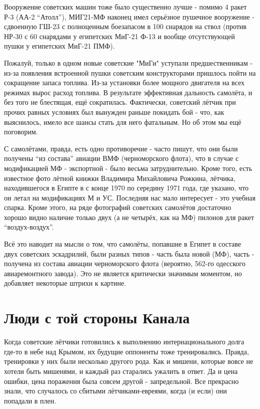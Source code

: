 Вооружение советских машин тоже было существенно лучше - помимо 4 ракет Р-3 (АА-2 “Атолл”), МИГ21-МФ наконец имел серьёзное пушечное вооружение - сдвоенную ГШ-23 с полноценным боезапасом в 100 снарядов на ствол (против НР-30 с 60 снарядами у египетских МиГ-21 Ф-13 и вообще отсутствующей пушки у египетских МиГ-21 ПМФ).

Пожалуй, только в одном новые советские "МиГи" уступали предшественникам - из-за появления встроенной пушки советским конструкторами пришлось пойти на сокращение запаса топлива. Из-за установки более мощного двигателя на всех режимах вырос расход топлива. В результате эффективная дальность самолёта, и без того не блестящая, ещё сократилась. Фактически, советский лётчик при прочих равных условиях был вынужден раньше покидать бой - что, как выяснилось, имело все шансы стать для него фатальным. Но об этом мы ещё поговорим.

С самолётами, правда, есть одно противоречие - часто пишут, что они были получены “из состава” авиации ВМФ (черноморского флота), что в случае с модификацией МФ - экспортной - было весьма затруднительно. Кроме того, есть известное фото лётной книжки Владимира Михайловича Рожкина, лётчика, находившегося в Египте в с конце 1970 по середину 1971 года, где указано, что он летал на модификациях М и УС. Последняя нас мало интересует - это учебная спарка. Кроме этого, на ряде фотографий советских самолётов достаточно хорошо видно наличие только двух (а не четырёх, как на МФ) пилонов для ракет “воздух-воздух”.

Всё это наводит на мысли о том, что самолёты, попавшие в Египет в составе двух советских эскадрилий, были разных типов - часть была новой (МФ), часть - получена из состава авиации черноморского флота (вероятно, 562-го одесского авиаремонтного завода). Это не является критически значимым моментом, но добавляет некоторые штрихи к картине.

\section{Люди с той стороны Канала}

Когда советские лётчики готовились к выполнению интернационального долга где-то в небе над Крымом, их будущие оппоненты тоже тренировались. Правда, тренировки у них были несколько другого рода. Как и мишени, которые вовсе не хотели быть мишенями, и каждый раз старались ужалить в ответ. Да и цена ошибки, цена поражения была совсем другой - запредельной. Все прекрасно знали, что случалось со сбитыми лётчиками-евреями, когда (и если) они попадали в плен.

